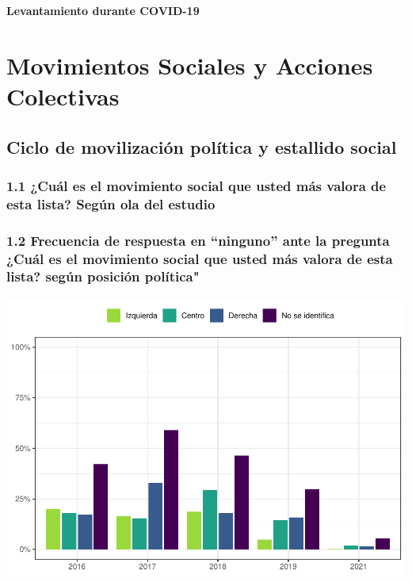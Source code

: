 \documentclass[
  12pt,
  openany]{book}
\begin{document}
\textbf{Levantamiento durante COVID-19}

\hypertarget{movimientos-sociales-y-acciones-colectivas}{%
\chapter{Movimientos Sociales y Acciones Colectivas}\label{movimientos-sociales-y-acciones-colectivas}}

\hypertarget{ciclo-de-movilizaciuxf3n-poluxedtica-y-estallido-social}{%
\section{Ciclo de movilización política y estallido social}\label{ciclo-de-movilizaciuxf3n-poluxedtica-y-estallido-social}}

\hypertarget{cuuxe1l-es-el-movimiento-social-que-usted-muxe1s-valora-de-esta-lista-seguxfan-ola-del-estudio}{%
\subsection{1.1 ¿Cuál es el movimiento social que usted más valora de esta lista? Según ola del estudio}\label{cuuxe1l-es-el-movimiento-social-que-usted-muxe1s-valora-de-esta-lista-seguxfan-ola-del-estudio}}

\hypertarget{frecuencia-de-respuesta-en-ninguno-ante-la-pregunta-cuuxe1l-es-el-movimiento-social-que-usted-muxe1s-valora-de-esta-lista-seguxfan-posiciuxf3n-poluxedtica}{%
\subsection{1.2 Frecuencia de respuesta en ``ninguno'' ante la pregunta ¿Cuál es el movimiento social que usted más valora de esta lista? según posición política"}\label{frecuencia-de-respuesta-en-ninguno-ante-la-pregunta-cuuxe1l-es-el-movimiento-social-que-usted-muxe1s-valora-de-esta-lista-seguxfan-posiciuxf3n-poluxedtica}}

\includegraphics{reporte-elsoc_files/figure-latex/unnamed-chunk-7-1.pdf}
\end{document}

